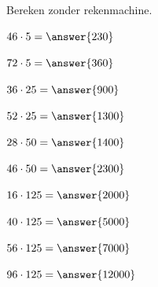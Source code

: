 \documentclass{ximera}
\begin{document}
\begin{oefening}{\oefB}

Bereken zonder rekenmachine.

\begin{question} \(46\cdot5=\answer{230}\) \end{question}

\begin{question} \(72\cdot5=\answer{360}\) \end{question}

\begin{question} \(36\cdot25=\answer{900}\) \end{question}

\begin{question} \(52\cdot25=\answer{1300}\) \end{question}

\begin{question} \(28\cdot50=\answer{1400}\) \end{question}

\begin{question} \(46\cdot50=\answer{2300}\) \end{question}

\begin{question} \(16\cdot125=\answer{2000}\) \end{question}

\begin{question} \(40\cdot125=\answer{5000}\) \end{question}

\begin{question} \(56\cdot125=\answer{7000}\) \end{question}

\begin{question} \(96\cdot125=\answer{12000}\) \end{question}

\end{oefening}


\end{document}
